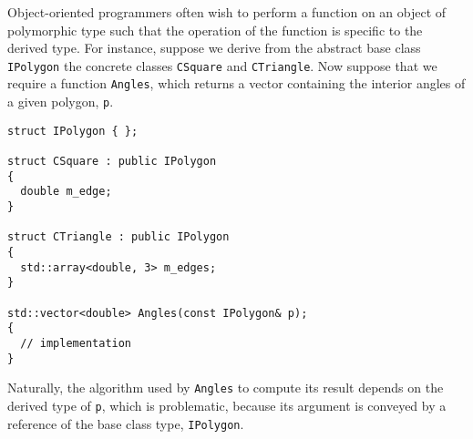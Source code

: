 \documentclass[10pt,a4paper,twocolumn]{article}
\newcommand\mycode[1]{{\small\texttt{#1}}}
\begin{document}
Object-oriented programmers often wish to perform a function on an object of polymorphic type such that the operation of the function is specific to the derived type. For instance, suppose we derive from the abstract base class \mycode{IPolygon} the concrete classes \mycode{CSquare} and \mycode{CTriangle}. Now suppose that we require a function \mycode{Angles}, which returns a vector containing the interior angles of a given polygon, \mycode{p}.

{\small\begin{verbatim}
struct IPolygon { };

struct CSquare : public IPolygon
{
  double m_edge;
}

struct CTriangle : public IPolygon
{
  std::array<double, 3> m_edges;
}

std::vector<double> Angles(const IPolygon& p);
{
  // implementation
}
\end{verbatim}}

Naturally, the algorithm used by \mycode{Angles} to compute its result depends on the derived type of \mycode{p}, which is problematic, because its argument is conveyed by a reference of the base class type, \mycode{IPolygon}.
\end{document}
